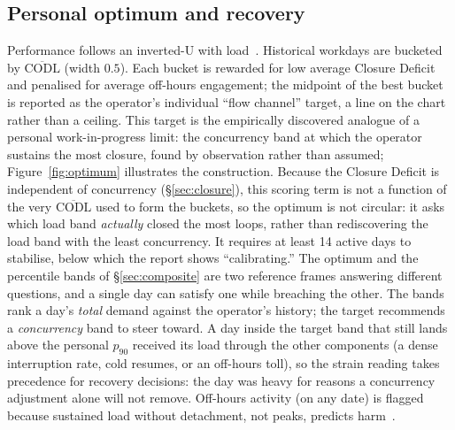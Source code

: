 \documentclass[10pt,twocolumn]{article}
\begin{document}
\subsection{Personal optimum and recovery}\label{sec:optimum}
Performance follows an inverted-U with load~\cite{yerkes1908,csikszentmihalyi1990}.
Historical workdays are bucketed by $\overline{\mathrm{CODL}}$ (width $0.5$).
Each bucket is rewarded for low average Closure Deficit and penalised for average
off-hours engagement; the midpoint
of the best bucket is reported as the operator's individual ``flow channel''
target, a line on the chart rather than a ceiling. This target is the
empirically discovered analogue of a personal work-in-progress limit: the
concurrency band at which the operator sustains the most closure, found by
observation rather than assumed; Figure~\ref{fig:optimum} illustrates the
construction. Because the Closure Deficit
is independent of concurrency (\S\ref{sec:closure}), this scoring term is not a
function of the very $\overline{\mathrm{CODL}}$ used to form the buckets, so
the optimum is not circular: it asks which load band \emph{actually} closed the
most loops, rather than rediscovering the load band with the least concurrency.
It requires at least 14 active days to stabilise, below which the report shows
``calibrating.''
The optimum and the percentile bands of \S\ref{sec:composite} are two
reference frames answering different questions, and a single day can satisfy
one while breaching the other. The bands rank a day's \emph{total} demand
against the operator's history; the target recommends a \emph{concurrency}
band to steer toward. A day inside the target band that still lands above the
personal $p_{90}$ received its load through the other components (a dense
interruption rate, cold resumes, or an off-hours toll), so the strain reading
takes precedence for recovery decisions: the day was heavy for reasons a
concurrency adjustment alone will not remove.
Off-hours activity (on any date) is flagged because sustained load without
detachment, not peaks, predicts harm~\cite{mcewen1998,sonnentag2007,sonnentag2010}.
\end{document}
